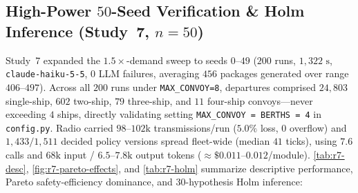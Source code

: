 \documentclass[11pt,a4paper,oneside]{report}
\begin{document}
\subsection{High-Power \texorpdfstring{$50$-Seed}{50-Seed} Verification \& Holm Inference (Study~7, \texorpdfstring{$n=50$}{n=50})}
\begin{sloppypar}
Study~7 expanded the $1.5\times$-demand sweep to seeds $0\text{--}49$ ($200$ runs, $1{,}322\text{ s}$, \texttt{claude-haiku-5-5}, $0$ LLM failures, averaging $456$ packages generated over range $406\text{--}497$). Across all $200$ runs under \texttt{MAX\_CONVOY=8}, departures comprised $24{,}803$ single-ship, $602$ two-ship, $79$ three-ship, and $11$ four-ship convoys---never exceeding $4$ ships, directly validating setting \texttt{MAX\_CONVOY = BERTHS = 4} in \texttt{config.py}. Radio carried $98\text{--}102\text{k}$ transmissions/run ($5.0\%$ loss, $0$ overflow) and $1{,}433/1{,}511$ decided policy versions spread fleet-wide (median $41$ ticks), using $7.6$ calls and $68\text{k}$ input / $6.5\text{--}7.8\text{k}$ output tokens ($\approx \$0.011\text{--}0.012$/module). \autoref{tab:r7-desc}, \autoref{fig:r7-pareto-effects}, and \autoref{tab:r7-holm} summarize descriptive performance, Pareto safety-efficiency dominance, and $30$-hypothesis Holm inference:
\end{sloppypar}

\begin{table}[H]
\centering
\caption[Descriptive performance in 50-seed Study 7]{Descriptive performance across $4$ arms $\times$ $50$ seeds ($200$ runs) in Study~7.}
\label{tab:r7-desc}
\end{table}
\end{document}

